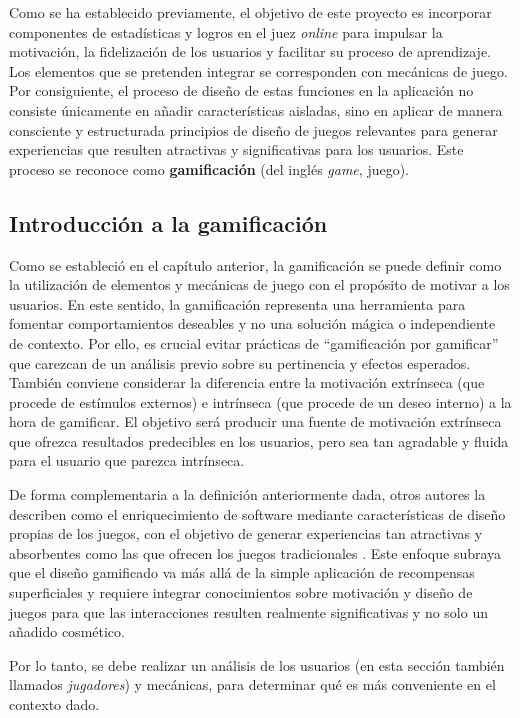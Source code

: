 Como se ha establecido previamente, el objetivo de este proyecto es incorporar componentes de estadísticas y logros en el juez \textit{online} \aer para impulsar la motivación, la fidelización de los usuarios y facilitar su proceso de aprendizaje. Los elementos que se pretenden integrar se corresponden con mecánicas de juego. Por consiguiente, el proceso de diseño de estas funciones en la aplicación no consiste únicamente en añadir características aisladas, sino en aplicar de manera consciente y estructurada principios de diseño de juegos relevantes para generar experiencias que resulten atractivas y significativas para los usuarios. Este proceso se reconoce como \textbf{gamificación} (del inglés \textit{game}, juego). 

\subsection{Introducción a la gamificación}

Como se estableció en el capítulo anterior, la gamificación se puede definir como la utilización de elementos y mecánicas de juego con el propósito de motivar a los usuarios. En este sentido, la gamificación representa una herramienta para fomentar comportamientos deseables y no una solución mágica o independiente de contexto. Por ello, es crucial evitar prácticas de “gamificación por gamificar” que carezcan de un análisis previo sobre su pertinencia y efectos esperados. También conviene considerar la diferencia entre la motivación extrínseca (que procede de estímulos externos) e intrínseca (que procede de un deseo interno) a la hora de gamificar. El objetivo será producir una fuente de motivación extrínseca que ofrezca resultados predecibles en los usuarios, pero sea tan agradable y fluida para el usuario que parezca intrínseca. 

De forma complementaria a la definición anteriormente dada, otros autores la describen como el enriquecimiento de software mediante características de diseño propias de los juegos, con el objetivo de generar experiencias tan atractivas y absorbentes como las que ofrecen los juegos tradicionales \citep{Morschheuser_Hassan_Werder_Hamari_2018}. Este enfoque subraya que el diseño gamificado va más allá de la simple aplicación de recompensas superficiales y requiere integrar conocimientos sobre motivación y diseño de juegos para que las interacciones resulten realmente significativas y no solo un añadido cosmético.

Por lo tanto, se debe realizar un análisis de los usuarios (en esta sección también llamados \textit{jugadores}) y mecánicas, para determinar qué es más conveniente en el contexto dado.

